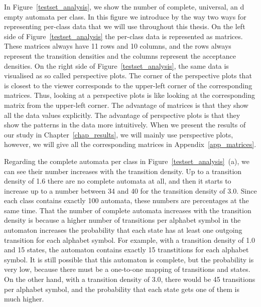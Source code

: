 In Figure~\ref{testset_analysis}, we show the number of complete, universal, an d empty automata per class. In this figure we introduce by the way two ways for representing per-class data that we will use throughout this thesis. On the left side of Figure~\ref{testset_analysis} the per-class data is represented as matrices. These matrices always have 11 rows and 10 columns, and the rows always represent the transition densities and the columns represent the acceptance densities. On the right side of Figure~\ref{testset_analysis}, the same data is visualised as so called perspective plots. The corner of the perspective plots that is closest to the viewer corresponds to the upper-left corner of the corresponding matrices. Thus, looking at a perspective plots is like looking at the corresponding matrix from the upper-left corner. The advantage of matrices is that they show all the data values explicitly. The advantage of perspective plots is that they show the patterns in the data more intuitively. When we present the results of our study in Chapter~\ref{chap_results}, we will mainly use perspective plots, however, we will give all the corresponding matrices in Appendix~\ref{app_matrices}.

Regarding the complete automata per class in Figure~\ref{testset_analysis}~(a), we can see their number increases with the transition density. Up to a transition density of 1.6 there are no complete automata at all, and then it starts to increase up to a number between 34 and 40 for the transition density of 3.0. Since each class contains exactly 100 automata, these numbers are percentages at the same time. That the number of complete automata increases with the transition density is because a higher number of transitions per alphabet symbol in the automaton increases the probability that each state has at least one outgoing transition for each alphabet symbol. For example, with a transition density of 1.0 and 15 states, the automaton contains exactly 15 transtitions for each alphabet symbol. It is still possible that this automaton is complete, but the probability is very low, because there must be a one-to-one mapping of transitions and states. On the other hand, with a transition density of 3.0, there would be 45 transitions per alphabet symbol, and the probability that each state gets one of them is much higher.

